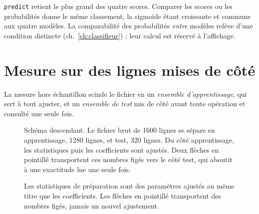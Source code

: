\texttt{predict} retient le plus grand des quatre scores. Comparer les scores ou
les probabilités donne le même classement, la sigmoïde étant croissante et
commune aux quatre modèles. La comparabilité des probabilités \emph{entre}
modèles relève d'une condition distincte (ch.~\ref{ch:classifieur}) ; leur calcul
est réservé à l'affichage.

\section{Mesure sur des lignes mises de côté}

La mesure hors échantillon scinde le fichier en un \emph{ensemble
d'apprentissage}, qui sert à tout ajuster, et un \emph{ensemble de test} mis de
côté avant toute opération et consulté une seule fois.

\begin{figure}[htbp]
\centering
\begin{graphique}{Schéma descendant. Le fichier brut de 1600 lignes se sépare en apprentissage, 1280 lignes, et test, 320 lignes. Du côté apprentissage, les statistiques puis les coefficients sont ajustés. Deux flèches en pointillé transportent ces nombres figés vers le côté test, qui aboutit à une exactitude lue une seule fois.}
\end{graphique}
\caption{Les statistiques de préparation sont des paramètres ajustés au même
titre que les coefficients. Les flèches en pointillé transportent des nombres
figés, jamais un nouvel ajustement.}
\label{fig:protocole}
\end{figure}
\FloatBarrier

